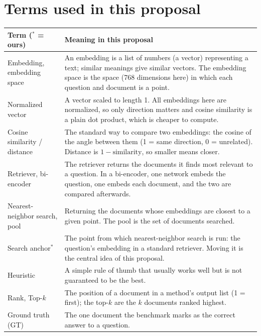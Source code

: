 \documentclass[12pt,a4paper]{article}
\begin{document}
\enlargethispage{1\baselineskip}
\section*{Terms used in this proposal}

\noindent\begin{minipage}{\textwidth}
\footnotesize{}\renewcommand{\arraystretch}{1.06}
\begin{tabularx}{\textwidth}{>{\raggedright\arraybackslash}p{3.5cm}>{\raggedright\arraybackslash}X}
\toprule
Term ($^*$ = ours) & Meaning in this proposal \\
\midrule
Embedding, embedding space & An embedding is a list of numbers (a vector) representing a text; similar meanings give similar vectors. The embedding space is the space (768 dimensions here) in which each question and document is a point. \\
Normalized vector & A vector scaled to length 1. All embeddings here are normalized, so only direction matters and cosine similarity is a plain dot product, which is cheaper to compute. \\
Cosine similarity / distance & The standard way to compare two embeddings: the cosine of the angle between them (1 = same direction, 0 = unrelated). Distance is $1 - \text{similarity}$, so smaller means closer. \\
Retriever, bi-encoder & The retriever returns the documents it finds most relevant to a question. In a bi-encoder, one network embeds the question, one embeds each document, and the two are compared afterwards. \\
Nearest-neighbor search, pool & Returning the documents whose embeddings are closest to a given point. The pool is the set of documents searched. \\
Search anchor$^*$ & The point from which nearest-neighbor search is run: the question's embedding in a standard retriever. Moving it is the central idea of this proposal. \\
Heuristic & A simple rule of thumb that usually works well but is not guaranteed to be the best. \\
Rank, Top-$k$ & The position of a document in a method's output list (1 = first); the top-$k$ are the $k$ documents ranked highest. \\
Ground truth (GT) & The one document the benchmark marks as the correct answer to a question. \\

\end{tabularx}
\end{minipage}
\end{document}
